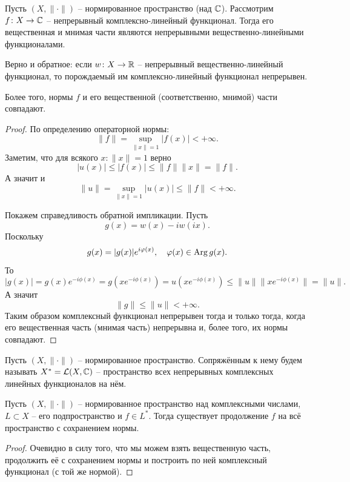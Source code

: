 \begin{lemma}
    Пусть $(X, \|\cdot\|)$ -- нормированное пространство (над $\mathbb{C}$).
    Рассмотрим $f\colon X \to \mathbb{C}$ -- непрерывный комплексно-линейный функционал.
    Тогда его вещественная и мнимая части являются непрерывными вещественно-линейными функционалами.

    Верно и обратное: если $w\colon X \to \mathbb{R}$ -- непрерывный вещественно-линейный функционал, то порождаемый им комплексно-линейный функционал непрерывен.

    Более того, нормы $f$ и его вещественной (соответственно, мнимой) части совпадают.
\end{lemma}
\begin{proof}
    По определению операторной нормы:
    \[
        \|f\| = \sup_{\|x\| = 1} |f(x)| < +\infty.
    \]
    Заметим, что для всякого $x\colon \|x\| = 1$ верно
    \[
        |u(x)| \leq |f(x)| \leq  \|f\|\|x\| = \|f\|.
    \]
    А значит и
    \[
        \|u\| = \sup_{\|x\| = 1} |u(x)| \leq \|f\| < +\infty.
    \]

    Покажем справедливость обратной импликации.
    Пусть
    \[
        g(x) = w(x) - iw(ix).
    \]
    Поскольку
    \[
        g(x) = |g(x)|e^{i \varphi(x)},\quad \varphi(x) \in \operatorname{Arg} g(x).
    \]
    То
    \[
        |g(x)| = g(x)e^{-i\phi(x)} = g\left(x e^{-i\phi(x)}\right) = u\left(x e^{-i\phi(x)}\right) \leq \|u\|\|x e^{-i\phi(x)}\| = \|u\|.
    \]
    А значит
    \[
        \|g\| \leq \|u\| < +\infty.
    \]
    Таким образом комплексный функционал непрерывен тогда и только тогда, когда его вещественная часть (мнимая часть) непрерывна и, более того, их нормы совпадают.
\end{proof}
\begin{definition}
    Пусть $(X, \|\cdot\|)$ -- нормированное пространство.
    Сопряжённым к нему будем называть $X^* = \mathcal{L}(X, \mathbb{C})$ -- пространство всех непрерывных комплексных линейных функционалов на нём.
\end{definition}
\begin{corollary}
    Пусть $(X, \|\cdot\|)$ -- нормированное пространство над комплексными числами, $L \subset X$ -- его подпространство и $f \in L^*$.
    Тогда существует продолжение $f$ на всё пространство с сохранением нормы.
\end{corollary}
\begin{proof}
    Очевидно в силу того, что мы можем взять вещественную часть, продолжить её с сохранением нормы и построить по ней комплексный функционал (с той же нормой).
\end{proof}
